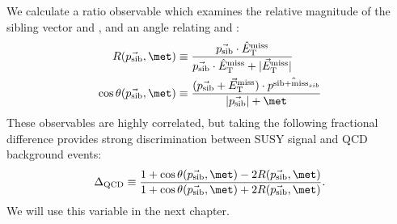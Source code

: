 We calculate a ratio observable which examines the relative magnitude of the sibling vector \psib and \met, and an angle relating \psib and \met:
\begin{align}
R( \psib, \met )          & \equiv \frac{\psib \cdot \methat}{ \psib \cdot \methat + |\metvec|} \\
\cos{\theta(\psib, \met)} & \equiv \frac{ (\psib + \metvec) \cdot \hat{p^{\text{sib+miss}_{sib}}}}{|\psib| + \met}
\end{align}
These observables are highly correlated, but taking the following fractional difference provides strong discrimination between SUSY signal and QCD background events:
\begin{align}
\Delta_{\mathrm{QCD}} \equiv \frac{1 + \cos{\theta(\psib, \met)} - 2 R(\psib, \met) }{1 + \cos{\theta(\psib, \met)} + 2 R(\psib, \met) }.
\end{align}
We will use this variable in the next chapter.